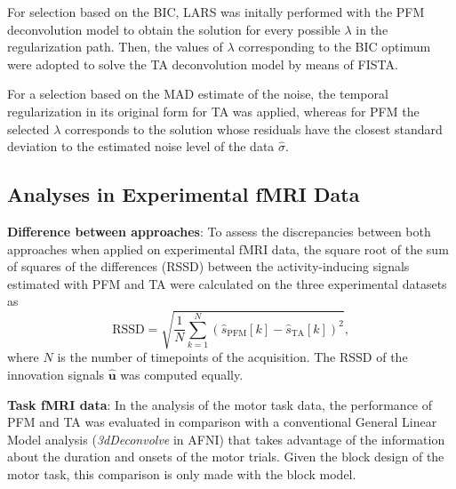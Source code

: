 For selection based on the BIC, LARS was initally performed with the PFM
deconvolution model to obtain the solution for every possible $\lambda$ in the
regularization path. Then, the values of $\lambda$ corresponding to the BIC
optimum were adopted to solve the TA deconvolution model by means of FISTA.

For a selection based on the MAD estimate of the noise, the temporal
regularization in its original form for TA was applied, whereas for PFM the
selected $\lambda$ corresponds to the solution whose residuals have the closest
standard deviation to the estimated noise level of the data $\hat{\sigma}$.

\subsection{Analyses in Experimental fMRI Data}

\textbf{Difference between approaches}: To assess the discrepancies between both
approaches when applied on experimental fMRI data, the square root of the sum of
squares of the differences (RSSD) between the activity-inducing signals
estimated with PFM and TA were calculated on the three experimental datasets as
\begin{equation}
    \text{RSSD} = \sqrt{\frac{1}{N} \sum_{k=1}^N (\hat{s}_\text{PFM}[k] - \hat{s}_\text{TA}[k])^2},
\end{equation}
where $N$ is the number of timepoints of the acquisition. The RSSD of the
innovation signals $\mathbf{\hat{u}}$ was computed equally.

\textbf{Task fMRI data}: In the analysis of the motor task data, the performance
of PFM and TA was evaluated in comparison with a conventional General Linear
Model analysis (\textit{3dDeconvolve} in AFNI) that takes advantage of the
information about the duration and onsets of the motor trials. Given the block
design of the motor task, this comparison is only made with the block model.

